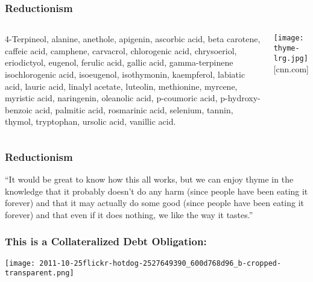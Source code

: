 \begin{frame}
  \frametitle{Reductionism}

  \begin{columns}
    \begin{block}{}
      4-Terpineol, alanine, anethole, apigenin, ascorbic acid, beta
      carotene, caffeic acid, camphene, carvacrol, chlorogenic acid,
      chrysoeriol, eriodictyol, eugenol, ferulic acid, gallic acid,
      gamma-terpinene isochlorogenic acid, isoeugenol, isothymonin,
      kaempferol, labiatic acid, lauric acid, linalyl acetate, luteolin,
      methionine, myrcene, myristic acid, naringenin, oleanolic acid,
      p-coumoric acid, p-hydroxy-benzoic acid, palmitic acid, rosmarinic
      acid, selenium, tannin, thymol, tryptophan, ursolic acid, vanillic
      acid.
    \end{block}
    \texttt{[image: thyme-lrg.jpg]}\\
    {\mbox{} \hfill \tiny [cnn.com]}
  \end{columns}

\end{frame}

\begin{frame}
  \frametitle{Reductionism}

  \begin{block}{}
  ``It would be great to know how this all works, but  we
  can enjoy thyme in the knowledge that it probably doesn't do any harm
  (since people have been eating it forever) and that it may actually do
  some good (since people have been eating it forever) and that even if
  it does nothing, we like the way it tastes.''

  \bigskip

  \end{block}

\end{frame}

\begin{frame}
\frametitle{This is a Collateralized Debt Obligation:}

  \texttt{[image: 2011-10-25flickr-hotdog-2527649390\_600d768d96\_b-cropped-transparent.png]}

  
\end{frame}

